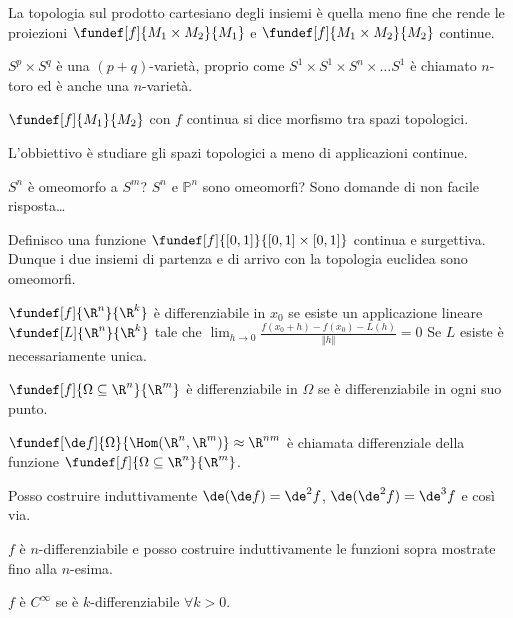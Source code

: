 \begin{oss}
La topologia sul prodotto cartesiano degli insiemi è quella meno fine che rende le proiezioni $\fundef[f]{M_1 \times M_2}{M_1}$ e $\fundef[f]{M_1 \times M_2}{M_2}$ continue.
\end{oss}
\begin{oss}
$S^p \times S^q$ è una $(p+q)$-varietà, proprio come $S^1 \times S^1 \times S^n \times \ldots S^1$ è chiamato $n$-toro ed è anche una $n$-varietà.
\end{oss}
\begin{defn}
$\fundef[f]{M_1}{M_2}$ con $f$ continua si dice morfismo tra spazi topologici.
\end{defn}
L'obbiettivo è studiare gli spazi topologici a meno di applicazioni continue.
\begin{oss} 
$S^n$ è omeomorfo a $S^m$? $S^n$ e $\mathbb{P}^n$ sono omeomorfi? 
Sono domande di non facile risposta\dots
\end{oss}
\begin{es}
Definisco una funzione $\fundef[f]{[0,1]}{[0,1]\times[0,1]}$ continua e surgettiva. Dunque i due insiemi di partenza e di arrivo con la topologia euclidea sono omeomorfi.
\end{es}
\begin{defn}
$\fundef[f]{\R^n}{\R^k}$ è differenziabile in $x_0$ se esiste un applicazione lineare $\fundef[L]{\R^n}{\R^k}$ tale che $\lim_{h\to 0}{\frac{f(x_0+h)-f(x_0)-L(h)}{\Vert h \Vert}}=0$
Se $L$ esiste è necessariamente unica.
\end{defn}
\begin{defn}
$\fundef[f]{\Omega \subseteq \R^n}{\R^m}$ è differenziabile in $\Omega$ se è differenziabile in ogni suo punto.
\end{defn}
\begin{defn}
$\fundef[\de f]{\Omega}{\Hom(\R^n, \R^m)} \approx \R^{nm}$ è chiamata differenziale della funzione $\fundef[f]{\Omega \subseteq \R^n}{\R^m}$.
\end{defn}
\begin{oss}
Posso costruire induttivamente $\de(\de f) = \de^2f$, $\de(\de^2f) = \de^3f$ e così via.
\end{oss}
\begin{oss}
$f$ è $n$-differenziabile e posso costruire induttivamente le funzioni sopra mostrate fino alla $n$-esima.
\end{oss}
\begin{defn}
$f$ è $C^{\infty}$ se è $k$-differenziabile $\forall k > 0$.
\end{defn}
